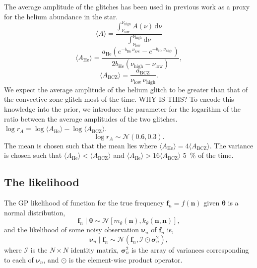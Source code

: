 \documentclass[linenumbers,modern]{aastex631dm}
\newcommand{\helium}{\mathrm{He}}
\newcommand{\bcz}{\mathrm{BCZ}}
\newcommand{\dd}{\mathrm{d}}
\begin{document}
The average amplitude of the glitches has been used in previous work as a proxy
for the helium abundance in the star.
%
\begin{equation}
    \langle A \rangle = \frac{
        \int_{\nu_\mathrm{low}}^{\nu_\mathrm{high}} A(\nu) \, \dd \nu
    }{
        \int_{\nu_\mathrm{low}}^{\nu_\mathrm{high}} \dd \nu
    }
\end{equation}
%
%
\begin{equation}
    \langle A_\helium \rangle = \frac{
        a_\helium \left(
            e^{- b_\helium \, \nu_\mathrm{low}}
            - e^{- b_\helium \, \nu_\mathrm{high}}
        \right)
    }{2 b_\helium (\nu_\mathrm{high} - \nu_\mathrm{low})},
\end{equation}
%
%
\begin{equation}
    \langle A_\bcz \rangle
    = \frac{a_\bcz}{\nu_\mathrm{low} \, \nu_\mathrm{high}}.
\end{equation}
%
We expect the average amplitude of the helium glitch to be greater than that of
the convective zone glitch most of the time. WHY IS THIS? To encode this
knowledge into the prior, we introduce the parameter for the logarithm of the
ratio between the average amplitudes of the two glitches.
\(\log r_A = \log \langle A_\helium \rangle - \log \langle A_\bcz \rangle\).
%
\begin{equation}
    \log r_A \sim \mathcal{N}(0.6, 0.3).
\end{equation}
%
The mean is chosen such that the mean lies where
\(\langle A_\helium \rangle = 4 \langle A_\bcz \rangle\). The variance is
chosen such that \(\langle A_\helium \rangle < \langle A_\bcz \rangle\) and
\(\langle A_\helium \rangle > 16 \langle A_\bcz \rangle\) \SI{5}{\percent} of
the time.


\subsection{The likelihood}

The GP likelihood of function for the true frequency \(\bm f_n = f(\bm n)\)
given \(\bm\theta\) is a normal distribution,
%
\begin{equation}
    \bm f_n \mid \bm\theta \sim
    \mathcal{N}\left[m_\theta(\bm n), k_\theta(\bm n, \bm n)\right],
\end{equation}
%
and the likelihood of some noisy observation \(\bm\nu_n\) of \(\bm f_n\) is,
%
\begin{equation}
    \bm\nu_n \mid \bm f_n
    \sim \mathcal{N}(\bm f_n, \bm{\mathcal{I}} \odot \bm\sigma_n^2),
\end{equation}
%
where \(\bm{\mathcal{I}}\) is the \(N \times N\) identity matrix,
\(\bm\sigma_n^2\) is the array of variances corresponding to each of
\(\bm\nu_n\), and \(\odot\) is the element-wise product operator.
\end{document}

